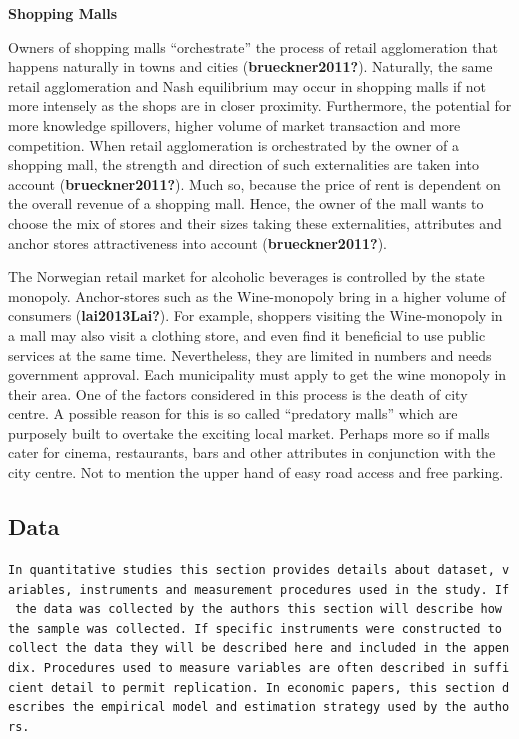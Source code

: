 \documentclass[
  10,
  a4paper,
]{article}
\begin{document}
\textbf{Shopping Malls}

Owners of shopping malls ``orchestrate'' the process of retail
agglomeration that happens naturally in towns and cities
(\textbf{brueckner2011?}). Naturally, the same retail agglomeration and
Nash equilibrium may occur in shopping malls if not more intensely as
the shops are in closer proximity. Furthermore, the potential for more
knowledge spillovers, higher volume of market transaction and more
competition. When retail agglomeration is orchestrated by the owner of a
shopping mall, the strength and direction of such externalities are
taken into account (\textbf{brueckner2011?}). Much so, because the price
of rent is dependent on the overall revenue of a shopping mall. Hence,
the owner of the mall wants to choose the mix of stores and their sizes
taking these externalities, attributes and anchor stores attractiveness
into account (\textbf{brueckner2011?}).

The Norwegian retail market for alcoholic beverages is controlled by the
state monopoly. Anchor-stores such as the Wine-monopoly bring in a
higher volume of consumers (\textbf{lai2013Lai?}). For example, shoppers
visiting the Wine-monopoly in a mall may also visit a clothing store,
and even find it beneficial to use public services at the same time.
Nevertheless, they are limited in numbers and needs government approval.
Each municipality must apply to get the wine monopoly in their area. One
of the factors considered in this process is the death of city centre. A
possible reason for this is so called ``predatory malls'' which are
purposely built to overtake the exciting local market. Perhaps more so
if malls cater for cinema, restaurants, bars and other attributes in
conjunction with the city centre. Not to mention the upper hand of easy
road access and free parking.

\hypertarget{data}{%
\subsection{Data}\label{data}}

\texttt{In\ quantitative\ studies\ this\ section\ provides\ details\ about\ dataset,\ variables,\ instruments\ and\ measurement\ procedures\ used\ in\ the\ study.\ If\ the\ data\ was\ collected\ by\ the\ authors\ this\ section\ will\ describe\ how\ the\ sample\ was\ collected.\ If\ specific\ instruments\ were\ constructed\ to\ collect\ the\ data\ they\ will\ be\ described\ here\ and\ included\ in\ the\ appendix.\ Procedures\ used\ to\ measure\ variables\ are\ often\ described\ in\ sufficient\ detail\ to\ permit\ replication.\ In\ economic\ papers,\ this\ section\ describes\ the\ empirical\ model\ and\ estimation\ strategy\ used\ by\ the\ authors.}
\end{document}
